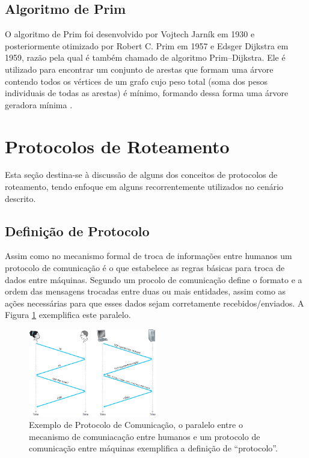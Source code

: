 \subsection{Algoritmo de Prim} 
\label{subsection-algoritmo-prim}
O algoritmo de Prim foi desenvolvido por  Vojtech Jarník em 1930 e posteriormente otimizado por Robert C. Prim em 1957 e Edsger Dijkstra em 1959, razão pela qual é também chamado de algoritmo Prim–Dijkstra. Ele é utilizado para encontrar um conjunto de arestas que formam uma árvore contendo todos os vértices de um grafo cujo peso total (soma dos pesos individuais de todas as arestas) é mínimo, formando dessa forma uma árvore geradora mínima \cite{Prim1957}.


\section{Protocolos de Roteamento}
\label{cap_protocolos_de_roteamento}
Esta seção destina-se à discussão de alguns dos conceitos de protocolos de roteamento, tendo enfoque em alguns recorrentemente utilizados no cenário descrito.

\subsection{Definição de Protocolo}
Assim como no mecanismo formal de troca de informações entre humanos um protocolo de comunicação é o que estabelece as regras básicas para troca de dados entre máquinas. Segundo \cite{Book-Kurose2013} um procolo de comunicação define o formato e a ordem das mensagens trocadas entre duas ou mais entidades, assim como as ações necessárias para que esses dados sejam corretamente recebidos/enviados. A Figura \ref{fig_explicacao_protocolo} exemplifica este paralelo.

\begin{figure}[!htb]
	\centering
	\includegraphics[width=0.5\textwidth]{./figuras/Explicacao-Protocolo.png} %
	\caption[Exemplo de Protocolo de Comunicação]{Exemplo de Protocolo de Comunicação, o paralelo entre o mecanismo de comuniacação entre humanos e um protocolo de comunicação entre máquinas exemplifica a definição de ``protocolo''.}
	\label{fig_explicacao_protocolo}
\end{figure}

